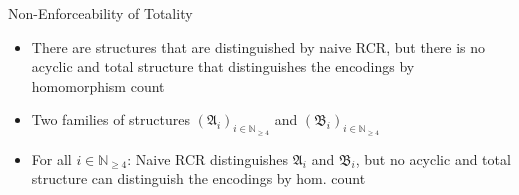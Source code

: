 \documentclass[aspectratio=169]{beamer}
\begin{document}
	\begin{frame}{Non-Enforceability of Totality}
		\begin{itemize}
			\item There are structures that are distinguished by naive RCR, but there is no acyclic and total structure that distinguishes the encodings by homomorphism count
			\item Two families of structures $(\mathfrak A_i)_{i\in\mathbb N_{\geq 4}}$ and $(\mathfrak B_i)_{i\in\mathbb N_{\geq 4}}$
			\item For all $i\in \mathbb N_{\geq 4}$: Naive RCR distinguishes $\mathfrak A_i$ and $\mathfrak B_i$, but no acyclic and total structure can distinguish the encodings by hom. count
		\end{itemize}
	\end{frame}
	
\end{document}

